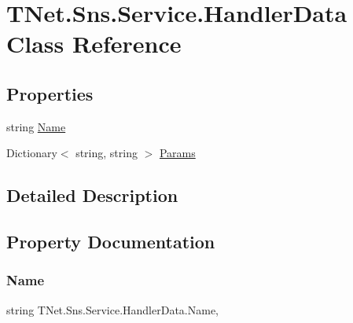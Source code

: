 \hypertarget{class_t_net_1_1_sns_1_1_service_1_1_handler_data}{}\section{T\+Net.\+Sns.\+Service.\+Handler\+Data Class Reference}
\label{class_t_net_1_1_sns_1_1_service_1_1_handler_data}


 


\subsection*{Properties}
\begin{DoxyCompactItemize}
\item 
string \mbox{\hyperlink{class_t_net_1_1_sns_1_1_service_1_1_handler_data_aeca8f715959713709a00dad895990cbb}{Name}}
\item 
Dictionary$<$ string, string $>$ \mbox{\hyperlink{class_t_net_1_1_sns_1_1_service_1_1_handler_data_ad6e44646694cfeb9f528b3f0a7c90178}{Params}}
\end{DoxyCompactItemize}


\subsection{Detailed Description}




\subsection{Property Documentation}
\mbox{\label{class_t_net_1_1_sns_1_1_service_1_1_handler_data_aeca8f715959713709a00dad895990cbb}} 
\subsubsection{\texorpdfstring{Name}{Name}}
{\footnotesize\ttfamily string T\+Net.\+Sns.\+Service.\+Handler\+Data.\+Name\hspace{0.3cm}{\ttfamily [get]}, {\ttfamily [set]}}





